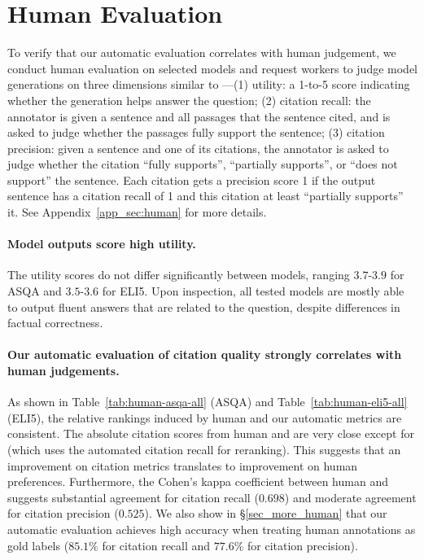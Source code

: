 \section{Human Evaluation}
\label{sec:human}


To verify that our automatic evaluation correlates with human judgement, 
we conduct human evaluation on selected models %
and request workers 
to judge model generations on three dimensions similar to \citet{liu2023evaluating}---(1) utility: a 1-to-5 score indicating whether the generation helps answer the question; %
(2) citation recall: the annotator is given a sentence and all passages that the sentence cited, and is asked to judge whether the passages fully support the sentence; %
(3) citation precision: given a sentence and one of its citations, the annotator is  asked to judge whether the citation ``fully supports'', ``partially supports'', or ``does not support'' the sentence. 
Each citation gets a precision score 1 if the output sentence has a citation recall of 1 and this citation at least ``partially supports'' it.
See Appendix~\ref{app_sec:human} for more details.





\paragraph{Model outputs score high utility.} 
The utility scores do not differ significantly between models, ranging $3.7$-$3.9$ for ASQA and $3.5$-$3.6$  for ELI5. 
Upon inspection, all tested models are mostly able to output fluent answers that are related to the question, %
despite  differences in factual correctness. 





\paragraph{Our automatic evaluation of citation quality strongly correlates with human judgements.}
As shown in Table~\ref{tab:human-asqa-all} (ASQA) and Table~\ref{tab:human-eli5-all} (ELI5),
the relative rankings induced by human and our automatic metrics are consistent.
The absolute citation scores from human and \citeeval{} are very close except for \rerank{} (which uses the automated citation recall for reranking).
This suggests that an improvement on \citeeval{} citation metrics translates to improvement on human preferences. %
Furthermore, the Cohen's kappa coefficient between 
human and \citeeval{} suggests substantial agreement for citation recall ($0.698$) and moderate agreement for citation precision ($0.525$).
We also show in \S\ref{sec_more_human} that our automatic evaluation achieves high accuracy when treating human annotations as gold labels
($85.1\%$ for citation recall and $77.6\%$ for citation precision).










